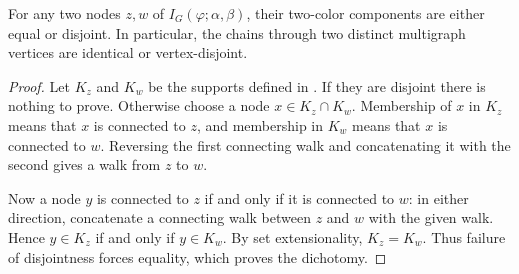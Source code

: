 \begin{lemma}
For any two nodes $z,w$ of $I_G(\varphi;\alpha,\beta)$, their two-color
components are either equal or disjoint.  In particular, the chains through
two distinct multigraph vertices are identical or vertex-disjoint.
\end{lemma}
\begin{proof}
Let $K_z$ and $K_w$ be the supports defined in
.  If they are disjoint there is nothing to
prove.  Otherwise choose a node $x\in K_z\cap K_w$.  Membership of $x$ in
$K_z$ means that $x$ is connected to $z$, and membership in $K_w$ means
that $x$ is connected to $w$.  Reversing the first connecting walk and
concatenating it with the second gives a walk from $z$ to $w$.

Now a node $y$ is connected to $z$ if and only if it is connected to $w$:
in either direction, concatenate a connecting walk between $z$ and $w$
with the given walk.  Hence $y\in K_z$ if and only if $y\in K_w$.  By set
extensionality, $K_z=K_w$.  Thus failure of disjointness forces equality,
which proves the dichotomy.
\end{proof}
